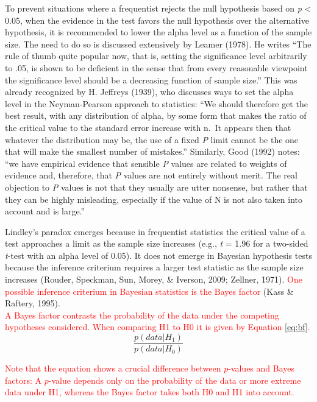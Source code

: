 \documentclass[
  english,
  ,man, a4paper,floatsintext]{apa6}
\begin{document}
To prevent situations where a frequentist rejects the null hypothesis based on \emph{p} \textless{} 0.05, when the evidence in the test favors the null hypothesis over the alternative hypothesis, it is recommended to lower the alpha level as a function of the sample size. The need to do so is discussed extensively by Leamer (1978). He writes ``The rule of thumb quite popular now, that is, setting the significance level arbitrarily to .05, is shown to be deficient in the sense that from every reasonable viewpoint the significance level should be a decreasing function of sample size.'' This was already recognized by H. Jeffreys (1939), who discusses ways to set the alpha level in the Neyman-Pearson approach to statistics: ``We should therefore get the best result, with any distribution of alpha, by some form that makes the ratio of the critical value to the standard error increase with n.~It appears then that whatever the distribution may be, the use of a fixed \emph{P} limit cannot be the one that will make the smallest number of mistakes.'' Similarly, Good (1992) notes: ``we have empirical evidence that sensible \emph{P} values are related to weights of evidence and, therefore, that \emph{P} values are not entirely without merit. The real objection to \emph{P} values is not that they usually are utter nonsense, but rather that they can be highly misleading, especially if the value of N is not also taken into account and is large.''

Lindley's paradox emerges because in frequentist statistics the critical value of a test approaches a limit as the sample size increases (e.g., \emph{t} = 1.96 for a two-sided \emph{t}-test with an alpha level of 0.05). It does not emerge in Bayesian hypothesis tests because the inference criterium requires a larger test statistic as the sample size increases (Rouder, Speckman, Sun, Morey, \& Iverson, 2009; Zellner, 1971). \textcolor{red}{One possible inference criterium in Bayesian statistics is the Bayes factor} (Kass \& Raftery, 1995).\\
\textcolor{red}{A Bayes factor contrasts the probability of the data under the competing hypotheses considered. When comparing H1 to H0 it is given by Equation \ref{eq:bf}.}
\begin{equation}
\frac{p(data|H_1)}{p(data|H_0)}
\label{eq:bf}
\end{equation}

\textcolor{red}{Note that the equation shows a crucial difference between $p$-values and Bayes factors: A $p$-value depends only on the probability of the data or more extreme data under H1, whereas the Bayes factor takes both H0 and H1 into account.}
\end{document}
